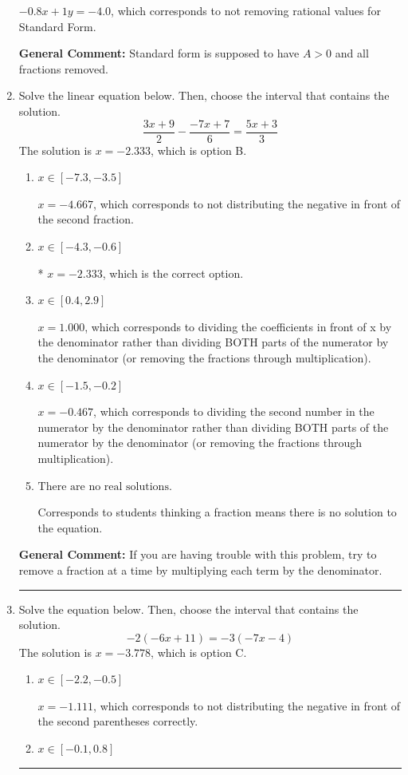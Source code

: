 \documentclass{extbook}[14pt]
\newcommand{\litem}[1]{\item #1

\rule{\textwidth}{0.4pt}}
\begin{document}
\begin{enumerate}
{\begin{enumerate}[label=\Alph*.]
 $-0.8x + 1y = -4.0$, which corresponds to not removing rational values for Standard Form.
\end{enumerate}

\textbf{General Comment:} Standard form is supposed to have $A > 0$ and all fractions removed.
}
\litem{
Solve the linear equation below. Then, choose the interval that contains the solution.
\[ \frac{3x + 9}{2} - \frac{-7x + 7}{6} = \frac{5x + 3}{3} \]The solution is \( x = -2.333 \), which is option B.\begin{enumerate}[label=\Alph*.]
\item \( x \in [-7.3, -3.5] \)

 $x = -4.667$, which corresponds to not distributing the negative in front of the second fraction.
\item \( x \in [-4.3, -0.6] \)

* $x = -2.333$, which is the correct option.
\item \( x \in [0.4, 2.9] \)

 $x = 1.000$, which corresponds to dividing the coefficients in front of x by the denominator rather than dividing BOTH parts of the numerator by the denominator (or removing the fractions through multiplication).
\item \( x \in [-1.5, -0.2] \)

 $x = -0.467$, which corresponds to dividing the second number in the numerator by the denominator rather than dividing BOTH parts of the numerator by the denominator (or removing the fractions through multiplication).
\item \( \text{There are no real solutions.} \)

Corresponds to students thinking a fraction means there is no solution to the equation.
\end{enumerate}

\textbf{General Comment:} If you are having trouble with this problem, try to remove a fraction at a time by multiplying each term by the denominator.
}
\litem{
Solve the equation below. Then, choose the interval that contains the solution.
\[ -2(-6x + 11) = -3(-7x -4) \]The solution is \( x = -3.778 \), which is option C.\begin{enumerate}[label=\Alph*.]
\item \( x \in [-2.2, -0.5] \)

$x = -1.111$, which corresponds to not distributing the negative in front of the second parentheses correctly.
\item \( x \in [-0.1, 0.8] \)


\end{enumerate}}
\end{enumerate}
\end{document}
